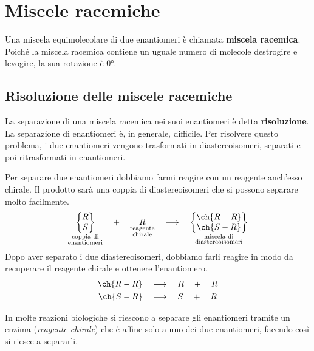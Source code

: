 \section{Miscele racemiche}
Una miscela equimolecolare di due enantiomeri è chiamata \textbf{miscela racemica}. Poiché la miscela racemica contiene un uguale numero di molecole destrogire e levogire, la sua rotazione è \ang{0}.

\subsection{Risoluzione delle miscele racemiche}
La separazione di una miscela racemica nei suoi enantiomeri è detta \textbf{risoluzione}. La separazione di enantiomeri è, in generale, difficile. Per risolvere questo problema, i due enantiomeri vengono trasformati in diastereoisomeri, separati e poi ritrasformati in enantiomeri.

Per separare due enantiomeri dobbiamo farmi reagire con un reagente anch'esso chirale. Il prodotto sarà una coppia di diastereoisomeri che si possono separare molto facilmente.
\begin{equation*}
	\underset{\substack{\text{coppia di}\\\text{enantiomeri}}}{
		\begin{Bmatrix}R\\S\end{Bmatrix}}
	\quad + \quad \underset{\substack{\text{reagente}\\\text{chirale}}}{R}
	\quad\longrightarrow\quad
	\underset{\substack{\text{miscela di}\\\text{diastereoisomeri}}}{
		\begin{Bmatrix}\ch{R-R}\\\ch{S-R}\end{Bmatrix}}
\end{equation*}
Dopo aver separato i due diastereoisomeri, dobbiamo farli reagire in modo da recuperare il reagente chirale e ottenere l'enantiomero.
\begin{gather*}
	\ch{R-R} \quad\longrightarrow\quad R \quad + \quad R\\
	\ch{S-R} \quad\longrightarrow\quad S \quad + \quad R
\end{gather*}

In molte reazioni biologiche si riescono a separare gli enantiomeri tramite un enzima (\textit{reagente chirale}) che è affine solo a uno dei due enantiomeri, facendo così si riesce a separarli. 